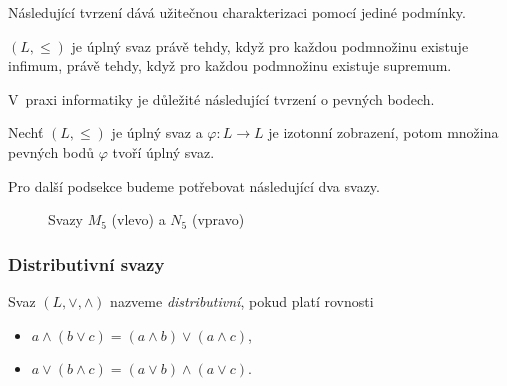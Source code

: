 Následující tvrzení dává užitečnou charakterizaci pomocí jediné
podmínky.

\begin{claim}
    $(L, \leq)$ je úplný svaz právě tehdy, když pro každou podmnožinu
    existuje infimum, právě tehdy, když pro každou podmnožinu existuje
    supremum.
\end{claim}

V~praxi informatiky je důležité následující tvrzení o pevných bodech.

\begin{claim}
    Nechť $(L, \leq)$ je úplný svaz a $\varphi : L \to L$ je izotonní
    zobrazení,
    potom množina pevných bodů $\varphi$ tvoří úplný svaz.
\end{claim}

Pro další podsekce budeme potřebovat následující dva svazy.

\begin{figure}[h!]
\centering
{}
\hspace{10pt}
\caption{Svazy $M_5$ (vlevo) a $N_5$ (vpravo)}
\end{figure}

\subsubsection{Distributivní svazy}

\begin{definition}
    Svaz $(L, \vee, \wedge)$ nazveme {\em distributivní},
    pokud platí rovnosti
    \begin{itemize}
        \item $a \wedge (b \vee c) = (a \wedge b) \vee (a \wedge c)$,
        \item $a \vee (b \wedge c) = (a \vee b) \wedge (a \vee c)$.
    \end{itemize}
\end{definition}

